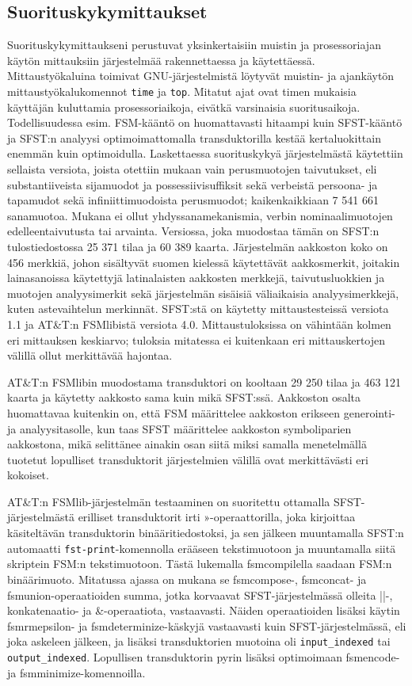 \documentclass[free]{flammie}
\begin{document}
\subsection{Suorituskykymittaukset}

Suorituskykymittaukseni perustuvat yksinkertaisiin muistin ja prosessoriajan
käytön mittauksiin järjestelmää rakennettaessa ja käytettäessä.
Mittaustyökaluina toimivat GNU-järjestelmistä löytyvät muistin- ja ajankäytön
mittaustyökalukomennot \texttt{time} ja \texttt{top}. Mitatut ajat ovat timen mukaisia käyttäjän kuluttamia prosessoriaikoja, eivätkä varsinaisia suoritusaikoja. Todellisuudessa esim. FSM-kääntö on
huomattavasti hitaampi kuin SFST-kääntö ja SFST:n analyysi optimoimattomalla transduktorilla kestää kertaluokittain enemmän kuin optimoidulla. Laskettaessa suorituskykyä järjestelmästä käytettiin sellaista versiota, joista otettiin mukaan
vain perusmuotojen taivutukset, eli substantiiveista sijamuodot ja possessiivisuffiksit sekä verbeistä persoona- ja tapamudot sekä infiniittimuodoista perusmuodot;
kaikenkaikkiaan 7 541 661 sanamuotoa. Mukana ei ollut yhdyssanamekanismia,
verbin nominaalimuotojen edelleentaivutusta tai arvainta. Versiossa, joka muodostaa tämän on SFST:n tulostiedostossa 25 371 tilaa ja 60 389 kaarta. Järjestelmän aakkoston koko on 456 merkkiä, johon sisältyvät suomen kielessä käytettävät
aakkosmerkit, joitakin lainasanoissa käytettyjä latinalaisten aakkosten merkkejä,
taivutusluokkien ja muotojen analyysimerkit sekä järjestelmän sisäisiä
väliaikaisia analyysimerkkejä, kuten astevaihtelun merkinnät. SFST:stä on
käytetty mittaustesteissä versiota 1.1 ja AT\&T:n FSMlibistä versiota 4.0. Mittaustuloksissa on
vähintään kolmen eri mittauksen keskiarvo; tuloksia mitatessa ei kuitenkaan eri
mittauskertojen välillä ollut merkittävää hajontaa.

AT\&T:n FSMlibin muodostama transduktori on kooltaan 29 250 tilaa ja 463 121
kaarta ja käytetty aakkosto sama kuin mikä SFST:ssä. Aakkoston osalta huomattavaa kuitenkin on, että FSM määrittelee aakkoston erikseen generointi- ja analyysitasolle, kun taas SFST määrittelee aakkoston symboliparien aakkostona, mikä
selittänee ainakin osan siitä miksi samalla menetelmällä tuotetut lopulliset transduktorit järjestelmien välillä ovat merkittävästi eri kokoiset.

AT\&T:n FSMlib-järjestelmän testaaminen on suoritettu ottamalla SFST-järjestelmästä erilliset transduktorit irti »-operaattorilla, joka kirjoittaa käsiteltävän transduktorin binääritiedostoksi, ja sen jälkeen muuntamalla SFST:n
automaatti \texttt{fst-print}-komennolla erääseen tekstimuotoon ja muuntamalla
siitä skriptein FSM:n tekstimuotoon. Tästä lukemalla fsmcompilella saadaan FSM:n binäärimuoto. Mitatussa ajassa on mukana se fsmcompose-,
fsmconcat- ja fsmunion-operaatioiden summa, jotka korvaavat SFST-järjestelmässä
olleita ||-, konkatenaatio- ja \&-operaatiota, vastaavasti. Näiden
operaatioiden lisäksi käytin fsmrmepsilon- ja fsmdeterminize-käskyjä
vastaavasti kuin SFST-järjestelmässä, eli joka askeleen jälkeen, ja lisäksi
transduktorien muotoina oli \verb|input_indexed| tai \verb|output_indexed|.
Lopullisen transduktorin pyrin lisäksi optimoimaan fsmencode- ja fsmminimize-komennoilla.
\end{document}

